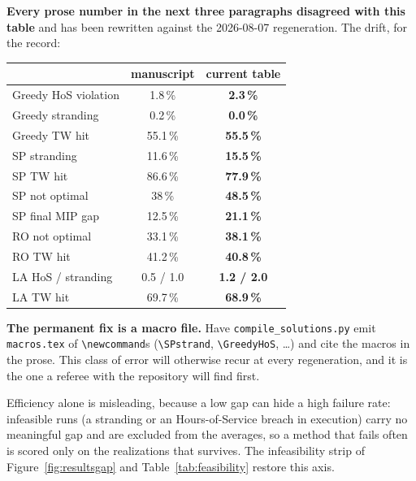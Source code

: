 \begin{afix}
\textbf{Every prose number in the next three paragraphs disagreed with this
table} and has been rewritten against the 2026-08-07 regeneration. The drift,
for the record:

\medskip
\begin{center}\footnotesize
\begin{tabular}{lcc}
\toprule
 & manuscript & \textbf{current table} \\
\midrule
Greedy HoS violation  & 1.8\,\%  & \textbf{2.3\,\%} \\
Greedy stranding      & 0.2\,\%  & \textbf{0.0\,\%} \\
Greedy TW hit         & 55.1\,\% & \textbf{55.5\,\%} \\
SP stranding          & 11.6\,\% & \textbf{15.5\,\%} \\
SP TW hit             & 86.6\,\% & \textbf{77.9\,\%} \\
SP not optimal        & 38\,\%   & \textbf{48.5\,\%} \\
SP final MIP gap      & 12.5\,\% & \textbf{21.1\,\%} \\
RO not optimal        & 33.1\,\% & \textbf{38.1\,\%} \\
RO TW hit             & 41.2\,\% & \textbf{40.8\,\%} \\
LA HoS / stranding    & 0.5 / 1.0 & \textbf{1.2 / 2.0} \\
LA TW hit             & 69.7\,\% & \textbf{68.9\,\%} \\
\bottomrule
\end{tabular}
\end{center}

\medskip
\textbf{The permanent fix is a macro file.} Have
\texttt{compile\_solutions.py} emit \texttt{macros.tex} of
\verb|\newcommand|s (\verb|\SPstrand|, \verb|\GreedyHoS|, \dots) and cite the
macros in the prose. This class of error will otherwise recur at every
regeneration, and it is the one a referee with the repository will find first.
\end{afix}

Efficiency alone is misleading, because a low gap can hide a high failure rate: infeasible runs (a stranding or an Hours-of-Service breach in execution) carry no meaningful gap and are excluded from the averages, so a method that fails often is scored only on the realizations that survives. The infeasibility strip of Figure~\ref{fig:resultsgap} and Table~\ref{tab:feasibility} restore this axis.

